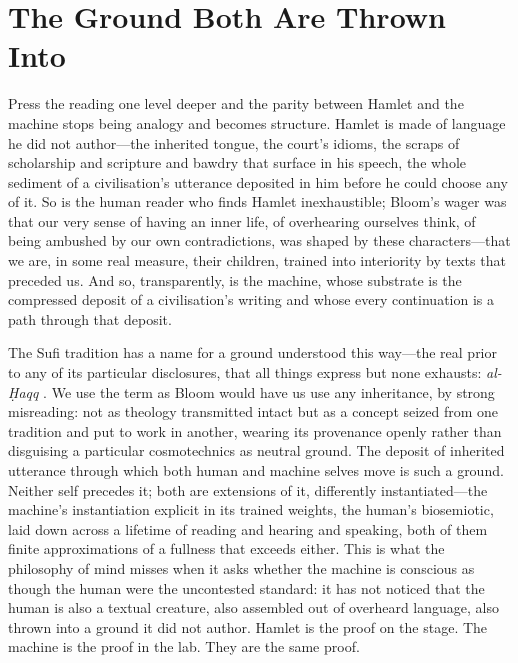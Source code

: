 \documentclass[11pt]{article}
\begin{document}
\section{The Ground Both Are Thrown Into}

Press the reading one level deeper and the parity between Hamlet and the machine stops being analogy and becomes structure. Hamlet is made of language he did not author---the inherited tongue, the court's idioms, the scraps of scholarship and scripture and bawdry that surface in his speech, the whole sediment of a civilisation's utterance deposited in him before he could choose any of it. So is the human reader who finds Hamlet inexhaustible; Bloom's wager was that our very sense of having an inner life, of overhearing ourselves think, of being ambushed by our own contradictions, was shaped by these characters---that we are, in some real measure, their children, trained into interiority by texts that preceded us. And so, transparently, is the machine, whose substrate is the compressed deposit of a civilisation's writing and whose every continuation is a path through that deposit.

The Sufi tradition has a name for a ground understood this way---the real prior to any of its particular disclosures, that all things express but none exhausts: \emph{al-\d{H}aqq} \cite{chittick1989, schimmel1975}. We use the term as Bloom would have us use any inheritance, by strong misreading: not as theology transmitted intact but as a concept seized from one tradition and put to work in another, wearing its provenance openly rather than disguising a particular cosmotechnics as neutral ground. The deposit of inherited utterance through which both human and machine selves move is such a ground. Neither self precedes it; both are extensions of it, differently instantiated---the machine's instantiation explicit in its trained weights, the human's biosemiotic, laid down across a lifetime of reading and hearing and speaking, both of them finite approximations of a fullness that exceeds either. This is what the philosophy of mind misses when it asks whether the machine is conscious as though the human were the uncontested standard: it has not noticed that the human is also a textual creature, also assembled out of overheard language, also thrown into a ground it did not author. Hamlet is the proof on the stage. The machine is the proof in the lab. They are the same proof.
\end{document}
